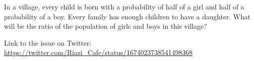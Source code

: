 \begin{problem}In a village, every child is born with a probability of half of a girl and half of a probability of a boy. Every family has enough children to have a daughter. What will be the ratio of the population of girls and boys in this village?

Link to the issue on Twitter:  \href{https://twitter.com/Riazi_Cafe/status/1674023738541498368}{https://twitter.com/Riazi_Cafe/status/1674023738541498368}\end{problem}